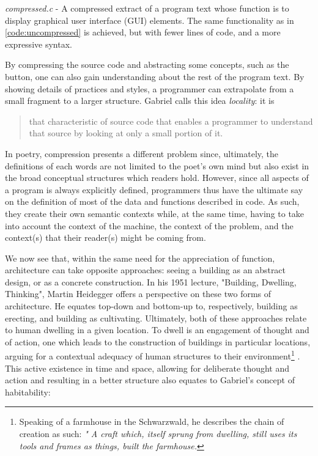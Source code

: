 \begin{listing}
    \inputminted[]{c}{./corpus/compressed.c}
    \caption{\emph{compressed.c} - A compressed extract of a program text whose function is to display graphical user interface (GUI) elements.  The same functionality as in \autoref{code:uncompressed} is achieved, but with fewer lines of code, and a more expressive syntax. \citep{muratori_semantic_2014}}
    \label{code:compressed}
\end{listing}

By compressing the source code and abstracting some concepts, such as the button, one can also gain understanding about the rest of the program text. By showing details of practices and styles, a programmer can extrapolate from a small fragment to a larger structure. Gabriel calls this idea \emph{locality}: it is

\begin{quote}
    that characteristic of source code that enables a programmer to understand that source by looking at only a small portion of it. \citep{gabriel_patterns_1998}
\end{quote}

In poetry, compression presents a different problem since, ultimately, the definitions of each words are not limited to the poet's own mind but also exist in the broad conceptual structures which readers hold. However, since all aspects of a program is always explicitly defined, programmers thus have the ultimate say on the definition of most of the data and functions described in code. As such, they create their own semantic contexts while, at the same time, having to take into account the context of the machine, the context of the problem, and the context(s) that their reader(s) might be coming from.

We now see that, within the same need for the appreciation of function, architecture can take opposite approaches: seeing a building as an abstract design, or as a concrete construction. In his 1951 lecture, "Building, Dwelling, Thinking", Martin Heidegger offers a perspective on these two forms of architecture. He equates top-down and bottom-up to, respectively, building as erecting, and building as cultivating. Ultimately, both of these approaches relate to human dwelling in a given location. To dwell is an engagement of thought and of action, one which leads to the construction of buildings in particular locations, arguing for a contextual adequacy of human structures to their environment\footnote{Speaking of a farmhouse in the Schwarzwald, he describes the chain of creation as such: \emph{" A craft which, itself sprung from dwelling, still uses its tools and frames as things, built the farmhouse.}} \citep{heidegger_building_1975}. This active existence in time and space, allowing for deliberate thought and action and resulting in a better structure also equates to Gabriel's concept of habitability:

